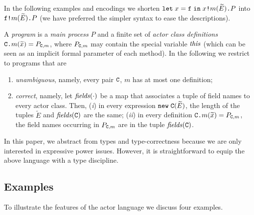 \documentclass{LMCS}
\theoremstyle{plain}\newtheorem{proposition}[thm]{Proposition}
\theoremstyle{plain}\newtheorem{lemma}[thm]{Lemma}
\theoremstyle{plain}\newtheorem{theorem}[thm]{Theorem}
\theoremstyle{plain}\newtheorem{corollary}[thm]{Corollary}
\newif\ifcamera \camerafalse
\newcommand{\invk}{\mbox{\tt !}}
\newcommand{\prefix}{\mbox{\tt .}}
\newcommand{\newact}[1]{{\tt new} \; #1}
\newcommand{\letin}[3]{{\tt let} \; #1 = #2 \; {\tt in} \; #3}
\newcommand{\f}{{\tt f}}
\newcommand{\fields}[1]{{\it fields}(#1)}
\newcommand{\wt}[1]{\widetilde{#1}}
\newcommand{\adef}[1]{{\tt #1}}
\newcommand{\xbar}{\wt{x}}
\begin{document}
In the following examples and
encodings we shorten $\letin{x}{\f}{x \invk m(\wt{E}) \prefix P}$ into 
$\f\invk m(\wt{E}) \prefix P$ (we have preferred the simpler syntax to ease
the descriptions).

A \emph{program} is a \emph{main process} $P$ and a finite set of \emph{actor class 
definitions} $\adef{C} \prefix 
m(\xbar) = P_{\adef{C},m}$, where $P_{\adef{C},m}$ may contain the special 
variable ${\it this}$ (which can be seen as an implicit formal parameter of each method). In the following we restrict to programs that are
\begin{enumerate}
\item
\emph{unambiguous}, namely, every pair $\adef{C}$, $m$ has at most one definition;
\item
\emph{correct}, namely, let $\fields{\cdot}$ be
a map that associates a tuple of 
field names to every actor class. Then, 
(\emph{i}) in every expression $\newact{\adef{C}}(\wt{E})$, the length of the 
tuples $\wt{E}$ and $\fields{\adef{C}}$ are the same;
(\emph{ii}) in every definition $\adef{C} \prefix 
m(\xbar) = P_{\adef{C},m}$, the field names 
occurring in $P_{\adef{C},m}$ are in the tuple  $\fields{\adef{C}}$.
\end{enumerate}
In this paper, we abstract from types and type-correctness because we are
only interested in expressive power issues. However, it is 
straightforward to equip the above language with a type discipline.

\ifcamera
\else
\subsection{Examples}
\label{sec.examples}
To illustrate the features of the actor language we discuss four
examples.
\end{document}
